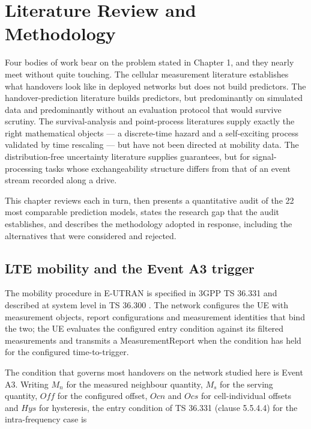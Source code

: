 \chapter{Literature Review and Methodology}\label{ch:2}

Four bodies of work bear on the problem stated in Chapter 1, and they nearly meet without quite touching. The cellular measurement literature establishes what handovers look like in deployed networks but does not build predictors. The handover-prediction literature builds predictors, but predominantly on simulated data and predominantly without an evaluation protocol that would survive scrutiny. The survival-analysis and point-process literatures supply exactly the right mathematical objects --- a discrete-time hazard and a self-exciting process validated by time rescaling --- but have not been directed at mobility data. The distribution-free uncertainty literature supplies guarantees, but for signal-processing tasks whose exchangeability structure differs from that of an event stream recorded along a drive.

This chapter reviews each in turn, then presents a quantitative audit of the 22 most comparable prediction models, states the research gap that the audit establishes, and describes the methodology adopted in response, including the alternatives that were considered and rejected.


\section{LTE mobility and the Event A3 trigger}
\label{sec:2_1}

The mobility procedure in E-UTRAN is specified in 3GPP TS 36.331 \cite{ref1} and described at system level in TS 36.300 \cite{ref2}. The network configures the UE with measurement objects, report configurations and measurement identities that bind the two; the UE evaluates the configured entry condition against its filtered measurements and transmits a MeasurementReport when the condition has held for the configured time-to-trigger.

The condition that governs most handovers on the network studied here is Event A3. Writing $M_n$ for the measured neighbour quantity, $M_s$ for the serving quantity, $\mathit{Off}$ for the configured offset, $\mathit{Ocn}$ and $\mathit{Ocs}$ for cell-individual offsets and $\mathit{Hys}$ for hysteresis, the entry condition of TS 36.331 (clause 5.5.4.4) for the intra-frequency case is


